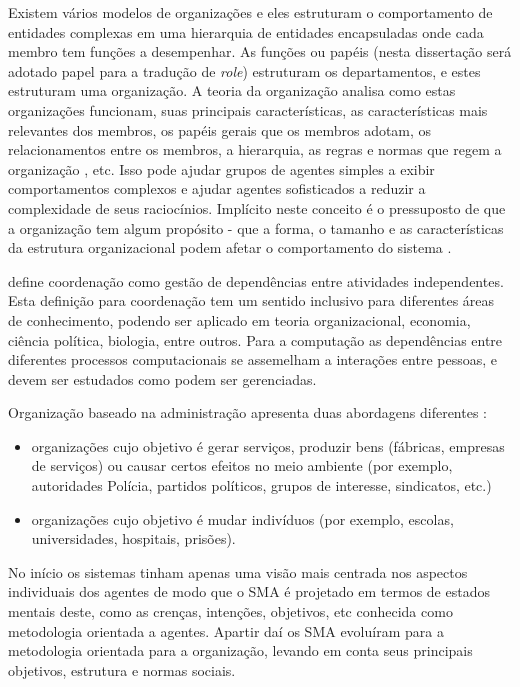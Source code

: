 \documentclass[dm,ppgcomp]{texfurg} %
\begin{document}
Existem vários modelos de organizações e eles estruturam o comportamento de entidades complexas em uma hierarquia de entidades encapsuladas onde cada membro tem funções a desempenhar. As funções ou papéis (nesta dissertação será adotado papel para a tradução de \textit{role}) estruturam os departamentos, e estes estruturam uma organização. A teoria da organização analisa como estas organizações funcionam, suas principais características, as características mais relevantes dos membros, os papéis gerais que os membros adotam, os relacionamentos entre os membros, a hierarquia, as regras e normas que regem a organização , etc\cite{argente2006multi}. Isso pode ajudar grupos de agentes simples a exibir comportamentos complexos e ajudar agentes sofisticados a reduzir a complexidade de seus raciocínios. Implícito neste conceito é o pressuposto de que a organização tem algum propósito - que a forma, o tamanho e as características da estrutura organizacional podem afetar o comportamento do sistema \cite{horling2004survey}.

\cite{malone1994interdisciplinary} define coordenação como gestão de dependências entre atividades independentes. Esta definição para coordenação tem um sentido inclusivo para diferentes áreas de conhecimento, podendo ser aplicado em teoria organizacional, economia, ciência política, biologia, entre outros. Para a computação as dependências entre diferentes processos computacionais se assemelham a interações entre pessoas, e devem ser estudados como podem ser gerenciadas.

Organização baseado na administração apresenta duas abordagens diferentes \cite{boella2006coordination}: 

\begin{itemize}
\item organizações cujo objetivo é gerar serviços, produzir bens (fábricas, empresas de serviços) ou causar certos efeitos no meio ambiente (por exemplo, autoridades Polícia, partidos políticos, grupos de interesse, sindicatos, etc.) 
\item organizações cujo objetivo é mudar indivíduos (por exemplo, escolas, universidades, hospitais, prisões).
\end{itemize}

No início os sistemas tinham apenas uma visão mais centrada nos aspectos individuais dos agentes de modo que o SMA é projetado em termos de estados mentais deste, como as crenças, intenções, objetivos, etc conhecida como metodologia orientada a agentes. Apartir daí os SMA evoluíram para a metodologia orientada para a organização, levando em conta seus principais objetivos, estrutura e normas sociais\cite{argente2006multi}. 
\end{document}
